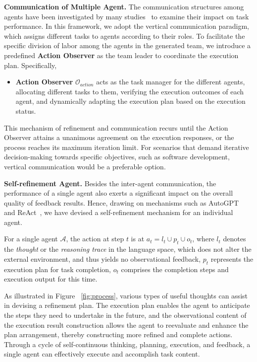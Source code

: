\noindent
\textbf{Communication of Multiple Agent.}
The communication structures among agents have been investigated by many studies~\cite{chen2023agentverse,wang2023unleashing,qian2023communicative,chan2023chateval} to examine their impact on task performance. 
In this framework, we adopt the vertical communication paradigm, which assigns different tasks to agents according to their roles.
To facilitate the specific division of labor among the agents in the generated team, we introduce a predefined \textbf{Action Observer} as the team leader to coordinate the execution plan.
Specifically,
\begin{itemize}
    \item \textbf{Action Observer} $\mathcal{O}_{action}$ acts as the task manager for the different agents, allocating different tasks to them, verifying the execution outcomes of each agent, and dynamically adapting the execution plan based on the execution status.
\end{itemize}
This mechanism of refinement and communication recurs until the Action Observer attains a unanimous agreement on the execution responses, or the process reaches its maximum iteration limit. For scenarios that demand iterative decision-making towards specific objectives, such as software development, vertical communication would be a preferable option.

\noindent
\textbf{Self-refinement Agent.}
Besides the inter-agent communication, the performance of a single agent also exerts a significant impact on the overall quality of feedback results. Hence, drawing on mechanisms such as AutoGPT~\cite{gravitasauto} and ReAct~\cite{yao2022react}, we have devised a self-refinement mechanism for an individual agent.

For a single agent $\mathcal{A}$, the action at step $t$ is at $a_t = l_t \cup p_t \cup o_t$, where $l_t$ denotes the \textit{thought} or the \textit{reasoning trace} in the language space, which does not alter the external environment, and thus yields no observational feedback, $p_t$ represents the execution plan for task completion, $o_t$ comprises the completion steps and execution output for this time.

As illustrated in Figure ~\ref{fig:process}, various types of useful thoughts can assist in devising a refinement plan. The execution plan enables the agent to anticipate the steps they need to undertake in the future, and the observational content of the execution result construction allows the agent to reevaluate and enhance the plan arrangement, thereby constructing more refined and complete actions. Through a cycle of self-continuous thinking, planning, execution, and feedback, a single agent can effectively execute and accomplish task content.


